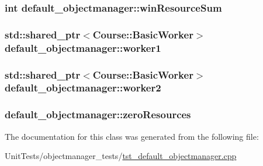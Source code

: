 \hypertarget{classdefault__objectmanager_af38ed335952982ee29259ce5df67e18e}{
\subsubsection[{win\-Resource\-Sum}]{\setlength{\rightskip}{0pt plus 5cm}int default\-\_\-objectmanager\-::win\-Resource\-Sum\hspace{0.3cm}{\ttfamily [private]}}}\label{classdefault__objectmanager_af38ed335952982ee29259ce5df67e18e}
\hypertarget{classdefault__objectmanager_a9372109fc55b6f04f2c6e5e888faa32c}{
\subsubsection[{worker1}]{\setlength{\rightskip}{0pt plus 5cm}std\-::shared\-\_\-ptr$<${\bf Course\-::\-Basic\-Worker}$>$ default\-\_\-objectmanager\-::worker1\hspace{0.3cm}{\ttfamily [private]}}}\label{classdefault__objectmanager_a9372109fc55b6f04f2c6e5e888faa32c}
\hypertarget{classdefault__objectmanager_aefff1e094b9f647478d960f1fbe0f897}{
\subsubsection[{worker2}]{\setlength{\rightskip}{0pt plus 5cm}std\-::shared\-\_\-ptr$<${\bf Course\-::\-Basic\-Worker}$>$ default\-\_\-objectmanager\-::worker2\hspace{0.3cm}{\ttfamily [private]}}}\label{classdefault__objectmanager_aefff1e094b9f647478d960f1fbe0f897}
\hypertarget{classdefault__objectmanager_a86108da49a76801538881c75d2a395db}{
\subsubsection[{zero\-Resources}]{ default\-\_\-objectmanager\-::zero\-Resources\hspace{0.3cm}{\ttfamily [private]}}}\label{classdefault__objectmanager_a86108da49a76801538881c75d2a395db}


The documentation for this class was generated from the following file\-:\begin{DoxyCompactItemize}
\item 
Unit\-Tests/objectmanager\-\_\-tests/\hyperlink{tst__default__objectmanager_8cpp}{tst\-\_\-default\-\_\-objectmanager.\-cpp}\end{DoxyCompactItemize}
